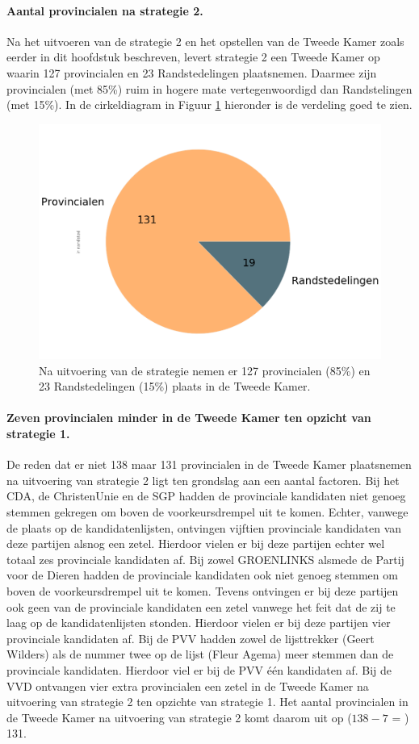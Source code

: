 \paragraph{Aantal provincialen na strategie 2.}
Na het uitvoeren van de strategie 2 en het opstellen van de Tweede Kamer zoals eerder in dit hoofdstuk beschreven, levert strategie 2 een Tweede Kamer op waarin 127 provincialen en 23 Randstedelingen plaatsnemen. Daarmee zijn provincialen (met  85\%) ruim in hogere mate vertegenwoordigd dan Randstelingen (met 15\%). In de cirkeldiagram in Figuur \ref{fig:pcS2P} hieronder is de verdeling goed te zien. 


\begin{figure}[H]
\centering
	\includegraphics[width=0.45\linewidth]{pie_chart_willekeurig_provincialen1.png}

			\caption{Na uitvoering van de strategie nemen er 127 provincialen (85\%) en 23 Randstedelingen (15\%) plaats in de Tweede Kamer.}

\label{fig:pcS2P}
\end{figure}





\paragraph{Zeven provincialen minder in de Tweede Kamer ten opzicht van strategie 1.}
De reden dat er niet 138 maar 131 provincialen in de Tweede Kamer plaatsnemen na uitvoering van strategie 2 ligt ten grondslag aan een aantal factoren. Bij het CDA, de ChristenUnie en de SGP hadden de provinciale kandidaten niet genoeg stemmen gekregen om boven de voorkeursdrempel uit te komen. Echter, vanwege de plaats op de kandidatenlijsten, ontvingen vijftien provinciale kandidaten van deze partijen alsnog een zetel. Hierdoor vielen er bij deze partijen echter wel totaal zes provinciale kandidaten af. Bij zowel GROENLINKS alsmede de Partij voor de Dieren hadden de provinciale kandidaten ook niet genoeg stemmen om boven de voorkeursdrempel uit te komen. Tevens ontvingen er bij deze partijen ook geen van de provinciale kandidaten een zetel vanwege het feit dat de zij te laag op de kandidatenlijsten stonden. Hierdoor vielen er bij deze partijen vier provinciale kandidaten af. Bij de PVV hadden zowel de lijsttrekker (Geert Wilders) als de nummer twee op de lijst (Fleur Agema) meer stemmen dan de provinciale kandidaten. Hierdoor viel er bij de PVV één kandidaten af. Bij de VVD ontvangen vier extra provincialen een zetel in de Tweede Kamer na uitvoering van strategie 2 ten opzichte van strategie 1. Het aantal provincialen in de Tweede Kamer na uitvoering van strategie 2 komt daarom uit op ($138-7$ = ) 131.



